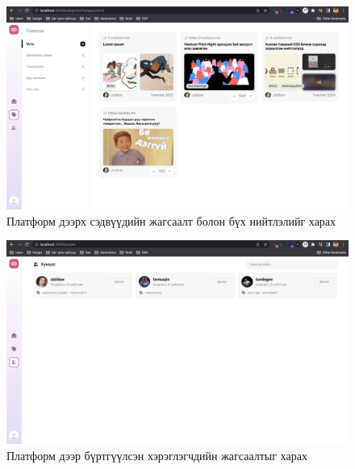 \begin{figure}[h]
	\centering
	\includegraphics[width=13cm]{images/implement/category.png}
	\caption{Платформ дээрх сэдвүүдийн жагсаалт болон бүх нийтлэлийг харах}
	\label{fig:category}
\end{figure}

\begin{figure}[h]
	\centering
	\includegraphics[width=13cm]{images/implement/users.png}
	\caption{Платформ дээр бүртгүүлсэн хэрэглэгчдийн жагсаалтыг харах}
	\label{fig:people-list}
\end{figure}
